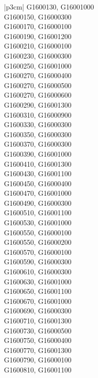 \begin{customLongTable}{ |p{3cm}| }
G1600130, G16001000 \\ \hline
G1600150, G16000300 \\ \hline
G1600170, G16000100 \\ \hline
G1600190, G16001200 \\ \hline
G1600210, G16000100 \\ \hline
G1600230, G16000300 \\ \hline
G1600250, G16001000 \\ \hline
G1600270, G16000400 \\ \hline
G1600270, G16000500 \\ \hline
G1600270, G16000600 \\ \hline
G1600290, G16001300 \\ \hline
G1600310, G16000900 \\ \hline
G1600330, G16000300 \\ \hline
G1600350, G16000300 \\ \hline
G1600370, G16000300 \\ \hline
G1600390, G16001000 \\ \hline
G1600410, G16001300 \\ \hline
G1600430, G16001100 \\ \hline
G1600450, G16000400 \\ \hline
G1600470, G16001000 \\ \hline
G1600490, G16000300 \\ \hline
G1600510, G16001100 \\ \hline
G1600530, G16001000 \\ \hline
G1600550, G16000100 \\ \hline
G1600550, G16000200 \\ \hline
G1600570, G16000100 \\ \hline
G1600590, G16000300 \\ \hline
G1600610, G16000300 \\ \hline
G1600630, G16001000 \\ \hline
G1600650, G16001100 \\ \hline
G1600670, G16001000 \\ \hline
G1600690, G16000300 \\ \hline
G1600710, G16001300 \\ \hline
G1600730, G16000500 \\ \hline
G1600750, G16000400 \\ \hline
G1600770, G16001300 \\ \hline
G1600790, G16000100 \\ \hline
G1600810, G16001100 \\ \hline

\end{customLongTable}
